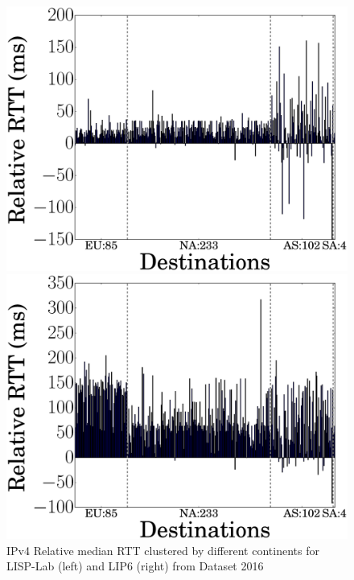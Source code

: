 \begin{figure}[!t]
	\begin{minipage}[c]{.49\linewidth}
		\begin{center}
			\includegraphics[width=\textwidth]{Pics/v4/Relative_median_avg(RTT)_LISP-Lab-FranceIX_changed_60.eps}
		\end{center}
	\end{minipage}
	\begin{minipage}[c]{.49\linewidth}
		\begin{center}
			\includegraphics[width=\textwidth]{Pics/v4/Relative_median_avg(RTT)_LIP6-FranceIX_changed_60.eps}
		\end{center}
	\end{minipage}
	\vspace{-0.5mm}
	\caption{IPv4 Relative median RTT clustered by different continents for LISP-Lab (left) and LIP6 (right) from Dataset 2016}
	\label{Relative_median_avg(RTT)_v4_2016}
\end{figure}
